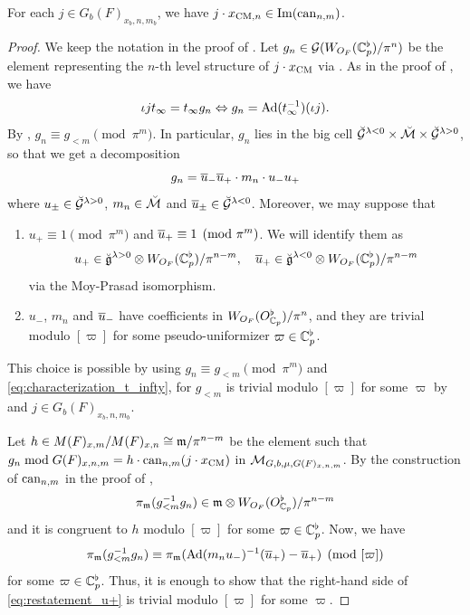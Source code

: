 \documentclass[12pt,reqno]{amsart}
\begin{document}
\begin{prop} \label{prop:image_x_CM_n_mb}
    For each $j \in G_b(F)_{x_b, n, m_b}$, we have $j \cdot x_{{\operatorname{CM}}, n} \in {\operatorname{Im}}({\operatorname{can}}_{n, m})$. 
\end{prop}
\begin{proof}
    We keep the notation in the proof of . Let $g_n \in {\mathcal{G}}(W_{O_F}(\mathbb{C}_p^\flat) / \pi^n)$ be the element representing the $n$-th level structure of $j \cdot x_{\operatorname{CM}}$ via . As in the proof of , we have 
    \begin{equation} \label{eq:characterization_t_infty}
        \iota j t_\infty = t_\infty g_n \Leftrightarrow g_n = {\operatorname{Ad}}(t_\infty^{-1})(\iota j).
    \end{equation}
    By , $g_n \equiv g_{<m} \pmod{\pi^m}$. In particular, $g_n$ lies in the big cell ${\mathcal{\breve{G}}}^{\lambda < 0} \times {\mathcal{\breve{M}}} \times {\mathcal{\breve{G}}}^{\lambda > 0}$, so that we get a decomposition 
    \[
        g_n = {\overline{u}}_- {\overline{u}}_+ \cdot m_n \cdot u_- u_+
    \]
    where $u_{\pm} \in {\mathcal{\breve{G}}}^{\lambda > 0}$, $m_n \in {\mathcal{\breve{M}}}$ and ${\overline{u}}_{\pm} \in {\mathcal{\breve{G}}}^{\lambda < 0}$. Moreover, we may suppose that
    \begin{enumerate}
        \item $u_+ \equiv 1 \pmod{\pi^m}$ and ${\overline{u}}_+ \equiv 1 \pmod{\pi^m}$. We will identify them as 
        \[
            u_+ \in {\mathfrak{\breve{g}}}^{\lambda > 0} \otimes W_{O_F}(\mathbb{C}_p^\flat) / \pi^{n - m} ,\quad 
            {\overline{u}}_+ \in {\mathfrak{\breve{g}}}^{\lambda < 0} \otimes W_{O_F}(\mathbb{C}_p^\flat) / \pi^{n - m}
        \]
        via the Moy-Prasad isomorphism. 
        \item $u_-$, $m_n$ and ${\overline{u}}_-$ have coefficients in $W_{O_F}(O_{\mathbb{C}_p}^\flat) / \pi^n$, and they are trivial modulo $[\varpi]$ for some pseudo-uniformizer $\varpi \in \mathbb{C}_p^\flat$. 
    \end{enumerate}
    This choice is possible by using $g_n \equiv g_{<m} \pmod{\pi^m}$ and \eqref{eq:characterization_t_infty}, for $g_{<m}$ is trivial modulo $[\varpi]$ for some $\varpi$ by  and $j \in G_b(F)_{x_b, n, m_b}$. 
    
    Let $h \in M(F)_{x, m} / M(F)_{x, n} \cong {\mathfrak{m}} / \pi^{n - m}$ be the element such that $g_n \bmod G(F)_{x, n, m} = h \cdot {\operatorname{can}}_{n, m}(j \cdot x_{\operatorname{CM}})$ in ${\mathcal{M}}_{G, b, \mu, G(F)_{x, n, m}}$. By the construction of ${\operatorname{can}}_{n, m}$ in the proof of , 
    \[
        \pi_{{\mathfrak{m}}}(g_{<m}^{-1} g_n) \in {\mathfrak{m}} \otimes W_{O_F}(O_{\mathbb{C}_p}^\flat) / \pi^{n - m}
    \]
    and it is congruent to $h$ modulo $[\varpi]$ for some $\varpi \in \mathbb{C}_p^\flat$. Now, we have
    \begin{equation} \label{eq:restatement_u+}
        \pi_{{\mathfrak{m}}}(g_{<m}^{-1} g_n) \equiv \pi_{{\mathfrak{m}}}({\operatorname{Ad}}(m_n u_-)^{-1}({\overline{u}}_+) - {\overline{u}}_+) \pmod{[\varpi]}
    \end{equation}
    for some $\varpi \in \mathbb{C}_p^\flat$. Thus, it is enough to show that the right-hand side of \eqref{eq:restatement_u+} is trivial modulo $[\varpi]$ for some $\varpi$. 
    

\end{proof}
\end{document}
